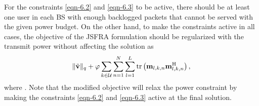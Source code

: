\begin{comment}
Since the allocated rate of user \me{j} is less than the queued packets, we can find a precoder \me{\mvec{m}{j}} with the additional power of \me{\Delta P} as \me{\mvec{m}{j}^\prime = \bar{\mbf{m}}_{j} + \mvec{V}{j} \mbf{e}^\prime}. Note that the new precoder has no impact on the interference constraint of other users. The newly found precoder \me{\mvec{m}{j}^\prime} minimize the queue of user \me{j} without affecting the rates of other user, there by reduces the objective further. It is in contradiction to our original assumption that the precoders are optimal and the objective is minimum. 

It can be seen that the constraints are tight as long as there is one user with unserviced backlogged packets at each \ac{BS} with the given power budget. Since the objective is not to minimize power, when the power budget is more than sufficient to service the backlogged packets of all users, the \ac{JSFRA} scheme is not guaranteed to find the minimum power precoders to empty the current backlogged packets in the system. The objective of the \ac{JSFRA} problem can be regularized by including the power term to find the minimum power precoders as
\begin{equation*}
\| \tilde{\mbf{v}} \|_q + \varphi \sum_{k \in \mc{U}} \sum_{n = 1}^{N} \sum_{l=1}^{L} \mathrm{tr} \left ( \mvec{m}{l,k,n} \mbf{m}^\herm_{l,k,n} \right ),
\end{equation*}
for a small \me{\varphi} without affecting the optimal solution. Note that the above objective is guaranteed to make the constraints \eqref{eqn-6.2} and \eqref{eqn-6.3} active by relaxing the power constraint \eqref{eqn-6.4}.
\end{comment}

For the constraints \eqref{eqn-6.2} and \eqref{eqn-6.3} to be active, there should be at least one user in each \ac{BS} with enough backlogged packets that cannot be served with the given power budget. On the other hand, to make the constraints active in all cases, the objective of the \ac{JSFRA} formulation should be regularized with the transmit power without affecting the solution as
\begin{equation*}
\| \tilde{\mathbf{v}} \|_q + \varphi \sum_{k \in \mathcal{U}} \sum_{n = 1}^{N} \sum_{l=1}^{L} \mathrm{tr} \left ( \mathbf{m}_{l,k,n} \mathbf{m}^{\mathrm{H}}_{l,k,n} \right ),
\end{equation*}
where . Note that the modified objective will relax the power constraint by making the constraints \eqref{eqn-6.2} and \eqref{eqn-6.3} active at the final solution.

